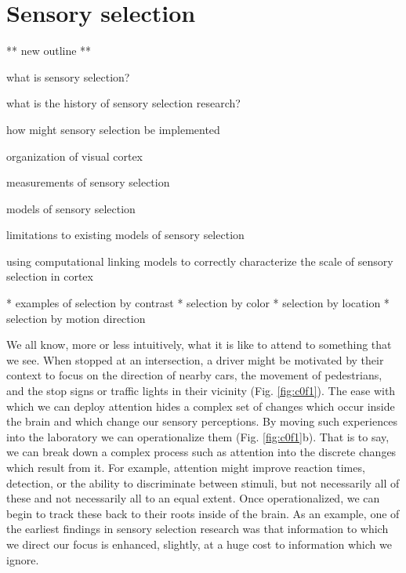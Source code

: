 \section{Sensory selection}

** new outline **

what is sensory selection?

what is the history of sensory selection research?

how might sensory selection be implemented

organization of visual cortex

measurements of sensory selection

models of sensory selection

limitations to existing models of sensory selection

using computational linking models to correctly characterize the scale of sensory selection in cortex

* examples of selection by contrast
* selection by color
* selection by location
* selection by motion direction



We all know, more or less intuitively, what it is like to attend to something that we see. When stopped at an intersection, a driver might be motivated by their context to focus on the direction of nearby cars, the movement of pedestrians, and the stop signs or traffic lights in their vicinity (Fig. \ref{fig:c0f1}). The ease with which we can deploy attention hides a complex set of changes which occur inside the brain and which change our sensory perceptions. By moving such experiences into the laboratory we can operationalize them (Fig. \ref{fig:c0f1}b). That is to say, we can break down a complex process such as attention into the discrete changes which result from it. For example, attention might improve reaction times, detection, or the ability to discriminate between stimuli, but not necessarily all of these and not necessarily all to an equal extent. Once operationalized, we can begin to track these back to their roots inside of the brain. As an example, one of the earliest findings in sensory selection research was that information to which we direct our focus is enhanced, slightly, at a huge cost to information which we ignore. 

